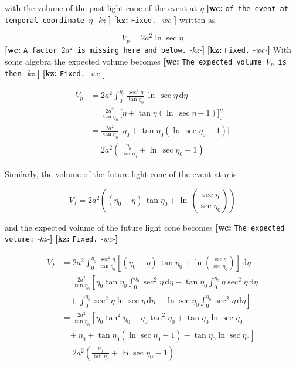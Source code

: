 \documentclass[preprint,notitlepage,amsmath,amssymb,floatfix]{revtex4-1}
\newcommand{\XXX}[3]{{\bf [#1: } {\tt #3} {\it -#2-}{\bf ]}}
\begin{document}
\noindent with the volume of the past light cone of the event at $\eta$ \XXX{wc}{kz}{of the event at temporal coordinate $\eta$} \XXX{kz}{wc}{Fixed.} written as

\begin{equation}
V_p = 2a^2\ln\sec\eta
\end{equation}
\XXX{wc}{kz}{A factor $2a^2$ is missing here and below.} \XXX{kz}{wc}{Fixed.}
\noindent With some algebra the expected volume becomes \XXX{wc}{kz}{The expected volume $\bar{V_p}$ is then} \XXX{kz}{wc}{Fixed.}

\begin{equation}
\begin{split}
V_p &= 2a^2\int_0^{\eta_0}\!\frac{\sec^2\eta}{\tan\eta_0}\,\ln\,\sec\eta\,\mathrm{d}\eta \\
  &= \frac{2a^2}{\tan\eta_0}\,\lbrack\eta + \tan\eta\left(\ln\,\sec\eta - 1\right)\rbrack_0^{\eta_0} \\
  &= \frac{2a^2}{\tan\eta_0}\,\lbrack\eta_0 + \tan\eta_0\left(\ln\,\sec\eta_0 - 1\right)\rbrack \\
  &= 2a^2\left(\frac{\eta_0}{\tan\eta_0} + \ln\,\sec\eta_0 - 1\right)
\end{split}
\end{equation}

\noindent Similarly, the volume of the future light cone of the event at $\eta$ is

\begin{equation}
V_f = 2a^2\left(\left(\eta_0 - \eta\right)\,\tan\eta_0 + \ln\,\left(\frac{\sec\eta}{\sec\eta_0}\right)\right)
\end{equation}

\noindent and the expected volume of the future light cone becomes \XXX{wc}{kz}{The expected volume:} \XXX{kz}{wc}{Fixed.}

\begin{equation}
\begin{split}
V_f &= 2a^2\int_0^{\eta_0} \! \frac{\sec^2\eta}{\tan\eta_0} \left[\left(\eta_0 - \eta\right)\,\tan\eta_0 + \ln\left(\frac{\sec\eta}{\sec\eta_0}\right) \right]\,\mathrm{d}\eta \\
  &= \frac{2a^2}{\tan\eta_0}\left[\eta_0\tan\eta_0\int_0^{\eta_0}\!\sec^2\eta\,\mathrm{d}\eta - \tan\eta_0 \int_0^{\eta_0}\!\eta\sec^2\eta\,\mathrm{d}\eta\right. \\ & \left.\,\,\,\,\, + \int_0^{\eta_0}\!\sec^2\eta\ln\sec\eta\,\mathrm{d}\eta - \ln\sec\eta_0\int_0^{\eta_0}\!\sec^2\eta\,\mathrm{d}\eta\right] \\
  &= \frac{2a^2}{\tan\eta_0}\left[\eta_0\tan^2\eta_0 - \eta_0\tan^2\eta_0 + \tan\eta_0\ln\sec\eta_0\right. \\ & \left.\,\,\,\,\, + \eta_0 + \tan\eta_0\left(\ln\sec\eta_0 - 1\right) - \tan\eta_0\ln\sec\eta_0\right] \\
  &= 2a^2\left(\frac{\eta_0}{\tan\eta_0} + \ln\sec\eta_0 - 1\right)
\end{split}
\end{equation}
\end{document}
